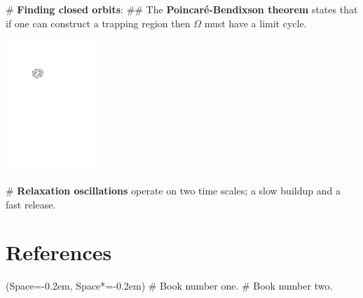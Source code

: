 \documentclass[11pt, a4paper]{article}
\newcommand{\listSpace}{-0.2em}%
\begin{document}
\begin{multicols}{2}
\begin{easylist}[itemize]
	# \textbf{Finding closed orbits}:
	## The \textbf{Poincaré-Bendixson theorem} states that if one can construct a trapping
	region then $\Omega$ must have a limit cycle.
	\begin{center}
		\includegraphics[width=3.5cm]{figs/trapping}
	\end{center}

	# \textbf{Relaxation oscillations} operate on two time scales; a slow 
	buildup and a fast release.
\end{easylist}

\section*{References}
\small
\begin{easylist}[itemize]
	\ListProperties(Space=\listSpace, Space*=\listSpace)
	# Book number one.
	# Book number two.
\end{easylist}
\end{multicols}
\end{document}
